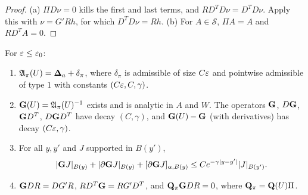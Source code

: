 \begin{proof}
(a) $\Pi D\nu=0$ kills the first and last terms, and $RD^TD\nu=D^TD\nu$. Apply this with $\nu=G'Rh$, for which $D^TD\nu=Rh$. (b) For $A\in\mathcal S$, $\Pi A=A$ and $RD^TA=0$.
\end{proof}

\begin{theorem}\label{thm:cov-gauge}
For $\varepsilon\le\varepsilon_0$:
\begin{enumerate}[label=(\alph*)]
\item $\mathfrak A_\pi(U)=\boldsymbol{\Delta}_a+\delta_\pi$, where $\delta_\pi$ is admissible of size $C\varepsilon$ and pointwise admissible of type $1$ with constants $(C\varepsilon,C,\gamma)$.
\item $\mathbf G(U)=\mathfrak A_\pi(U)^{-1}$ exists and is analytic in $A$ and $W$. The operators $\mathbf G$, $D\mathbf G$, $\mathbf G D^T$, $D\mathbf G D^T$ have decay $(C,\gamma)$, and $\mathbf G(U)-\mathbf G$ (with derivatives) has decay $(C\varepsilon,\gamma)$.
\item For all $y,y'$ and $J$ supported in $B(y')$,
\[
|\mathbf G J|_{B(y)}+|\partial\mathbf G J|_{B(y)}+[\partial\mathbf G J]_{\alpha,B(y)}\le Ce^{-\gamma|y-y'|}|J|_{B(y')} .
\]
\item $\mathbf G DR=DG'R$, $RD^T\mathbf G=RG'D^T$, and $\mathbf Q_\pi\mathbf G DR=0$, where $\mathbf Q_\pi=\mathbf Q(U)\Pi$.
\end{enumerate}
\end{theorem}

